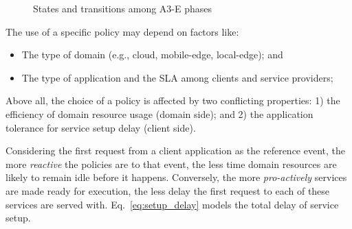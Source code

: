 \begin{figure}[tbp]
	\raggedright
	\hfill
	
	\hfill
	\caption{States and transitions among A3-E phases} \label{fig:A3-E-states}
\end{figure}

The use of a specific policy may depend on factors like:

\begin{itemize}

\item The type of domain (e.g., cloud, mobile-edge, local-edge); and

\item The type of application and the SLA among clients and service  providers;

\end{itemize}

Above all, the choice of a policy is affected by two conflicting properties: 1) the efficiency of domain resource usage (domain side); and 2) the application tolerance for service setup delay (client side). 

Considering the first request from a client application as the reference event, the more \textit{reactive} the policies are to that event, the less time domain resources are likely to remain idle before it happens. Conversely, the more \textit{pro-actively} services are made ready for execution, the less delay the first request to each of these services are served with. Eq.~\ref{eq:setup_delay} models the total delay of service setup. 

